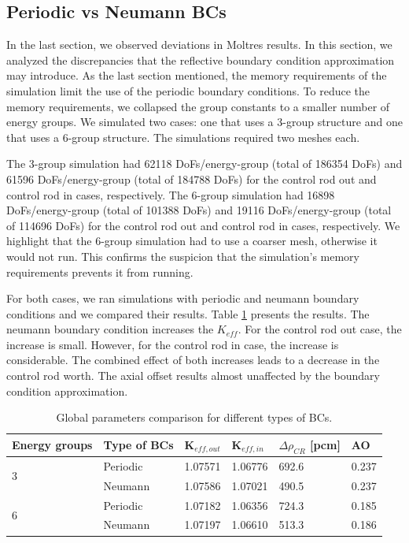 \documentclass[11pt,letterpaper]{article}
\begin{document}
\subsection{Periodic vs Neumann BCs}
\label{sec:bench-bcs}

In the last section, we observed deviations in Moltres results.
In this section, we analyzed the discrepancies that the reflective boundary condition approximation may introduce.
As the last section mentioned, the memory requirements of the simulation limit the use of the periodic boundary conditions.
To reduce the memory requirements, we collapsed the group constants to a smaller number of energy groups.
We simulated two cases: one that uses a 3-group structure and one that uses a 6-group structure.
The simulations required two meshes each.

The 3-group simulation had 62118 DoFs/energy-group (total of 186354 DoFs) and 61596 DoFs/energy-group (total of 184788 DoFs) for the control rod out and control rod in cases, respectively.
The 6-group simulation had 16898 DoFs/energy-group (total of 101388 DoFs) and 19116 DoFs/energy-group (total of 114696 DoFs) for the control rod out and control rod in cases, respectively.
We highlight that the 6-group simulation had to use a coarser mesh, otherwise it would not run.
This confirms the suspicion that the simulation's memory requirements prevents it from running.

For both cases, we ran simulations with periodic and neumann boundary conditions and we compared their results.
Table \ref{tab:benchmark-bc} presents the results.
The neumann boundary condition increases the $K_{eff}$.
For the control rod out case, the increase is small.
However, for the control rod in case, the increase is considerable.
The combined effect of both increases leads to a decrease in the control rod worth.
The axial offset results almost unaffected by the boundary condition approximation.

\begin{table}[htbp!]
  \centering
  \caption{Global parameters comparison for different types of BCs.}
  \begin{tabular}{l|l|l|l|l|l}
  \toprule
  Energy groups       & Type of BCs & K$_{eff, out}$ & K$_{eff, in}$ & $\Delta \rho_{CR}$ [pcm] & AO \\
  \midrule
  \multirow{2}{*}{3}  & Periodic    & 1.07571		& 1.06776		& 692.6		& 0.237		\\
                      & Neumann     & 1.07586	  & 1.07021   & 490.5		& 0.237	  \\ \hline
  \multirow{2}{*}{6}  & Periodic    & 1.07182		& 1.06356		& 724.3	  & 0.185  	\\
                      & Neumann     & 1.07197   & 1.06610 	& 513.3		& 0.186		\\  
  \bottomrule
  \end{tabular}
  \label{tab:benchmark-bc}
\end{table}
\end{document}
